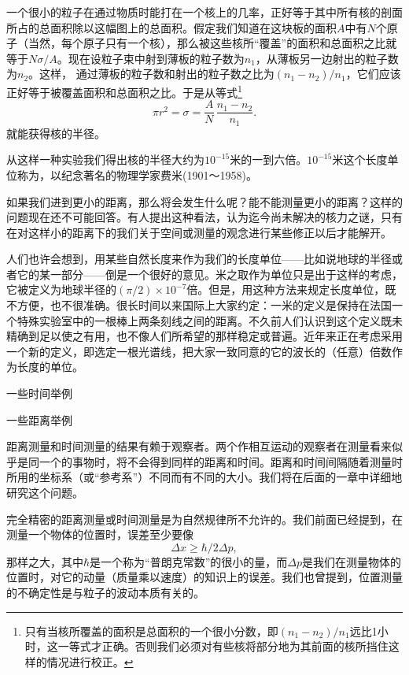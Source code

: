 \documentclass[12pt,oneside]{book}
\begin{document}
\begin{common-format}
一个很小的粒子在通过物质时能打在一个核上的几率，正好等于其中所有核的剖面所占的总面积除以这幅图上的总面积。假定我们知道在这块板的面积$A$中有$N$个原子（当然，每个原子只有一个核），那么被这些核所“覆盖”的面积和总面积之比就等于$N \sigma / A$。现在设粒子束中射到薄板的粒子数为$n_1$，从薄板另一边射出的粒子数为$n_2$。这样， 通过薄板的粒子数和射出的粒子数之比为$(n_1-n_2)/n_1$，它们应该正好等于被覆盖面积和总面积之比。于是从等式\footnote{只有当核所覆盖的面积是总面积的一个很小分数，即$(n_1-n_2)/n_1$远比1小时，这一等式才正确。否则我们必须对有些核将部分地为其前面的核所挡住这样的情况进行校正。}
\begin{equation*}
\pi r^2=\sigma=\frac{A}{N}\,
\frac{n_1-n_2}{n_1}.
\end{equation*}
就能获得核的半径。

从这样一种实验我们得出核的半径大约为$10^{-15}$米的一到六倍。$10^{-15}$米这个长度单位称为，以纪念著名的物理学家费米(1901～1958)。

如果我们进到更小的距离，那么将会发生什么呢？能不能测量更小的距离？这样的问题现在还不可能回答。有人提出这种看法，认为迄今尚未解决的核力之谜，只有在对这样小的距离下的我们关于空间或测量的观念进行某些修正以后才能解开。

人们也许会想到，用某些自然长度来作为我们的长度单位——比如说地球的半径或者它的某一部分——倒是一个很好的意见。米之取作为单位只是出于这样的考虑，它被定义为地球半径的$(\pi/2)\times10^{-7}$倍。但是，用这种方法来规定长度单位，既不方便，也不很准确。很长时间以来国际上大家约定：一米的定义是保持在法国一个特殊实验室中的一根棒上两条刻线之间的距离。不久前人们认识到这个定义既未精确到足以使之有用，也不像人们所希望的那样稳定或普遍。近年来正在考虑采用一个新的定义，即选定一根光谱线，把大家一致同意的它的波长的（任意）倍数作为长度的单位。

\begin{fig}{一些时间举例}
\caption{一些时间举例}
\label{fig:一些时间举例}
\end{fig}

\begin{fig}{一些距离举例}
\caption{一些距离举例}
\label{fig:一些距离举例}
\end{fig}

\noindent\dotfill

距离测量和时间测量的结果有赖于观察者。两个作相互运动的观察者在测量看来似乎是同一个的事物时，将不会得到同样的距离和时间。距离和时间间隔随着测量时所用的坐标系（或“参考系”）不同而有不同的大小。我们将在后面的一章中详细地研究这个问题。

完全精密的距离测量或时间测量是为自然规律所不允许的。我们前面已经提到，在测量一个物体的位置时，误差至少要像
\begin{equation*}
\Delta x\geq\hbar/2\Delta p,
\end{equation*}
那样之大，其中$\hbar$是一个称为“普朗克常数”的很小的量，而$\Delta p$是我们在测量物体的位置时，对它的动量（质量乘以速度）的知识上的误差。我们也曾提到，位置测量的不确定性是与粒子的波动本质有关的。


\end{common-format}
\end{document}
